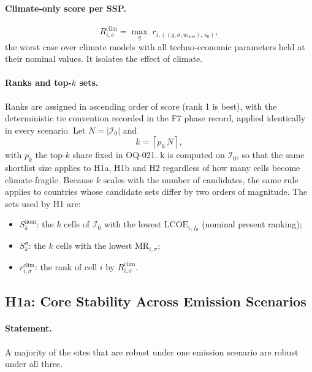 \paragraph{Climate-only score per SSP.}
\begin{equation}
    R^{\mathrm{clim}}_{i,\sigma}
    =\max_{g}\; r_{i,\left((g,\sigma,w_{\mathrm{core}}),\,s_0\right)},
    \label{eq:h1_clim_ssp}
\end{equation}
the worst case over climate models with all techno-economic parameters held at
their nominal values. It isolates the effect of climate.

\paragraph{Ranks and top-$k$ sets.}
Ranks are assigned in ascending order of score (rank 1 is best), with the
deterministic tie convention recorded in the F7 phase record, applied
identically in every scenario. Let $N=|\mathcal{I}_0|$ and
\begin{equation}
    k=\left\lceil p_k\,N\right\rceil,
    \label{eq:h1_k}
\end{equation}
with $p_k$ the top-$k$ share fixed in OQ-021. k is computed on $\mathcal{I}_0$, so that the same shortlist size applies to H1a, H1b and H2 regardless of how many cells become climate-fragile. Because $k$ scales with the
number of candidates, the same rule applies to countries whose candidate sets
differ by two orders of magnitude. The sets used by H1 are:
\begin{itemize}
    \item $S^{\mathrm{nom}}_{k}$: the $k$ cells of $\mathcal{I}_0$ with the lowest
    $\mathrm{LCOE}_{i,f_0}$ (nominal present ranking);
    \item $S^{\sigma}_{k}$: the $k$ cells with the lowest
    $\mathrm{MR}_{i,\sigma}$;
    \item $r^{\mathrm{clim}}_{i,\sigma}$: the rank of cell $i$ by
    $R^{\mathrm{clim}}_{i,\sigma}$.
\end{itemize}

\subsection{H1a: Core Stability Across Emission Scenarios}
\label{subsec:h1a}

\paragraph{Statement.}
A majority of the sites that are robust under one emission scenario are robust
under all three.

